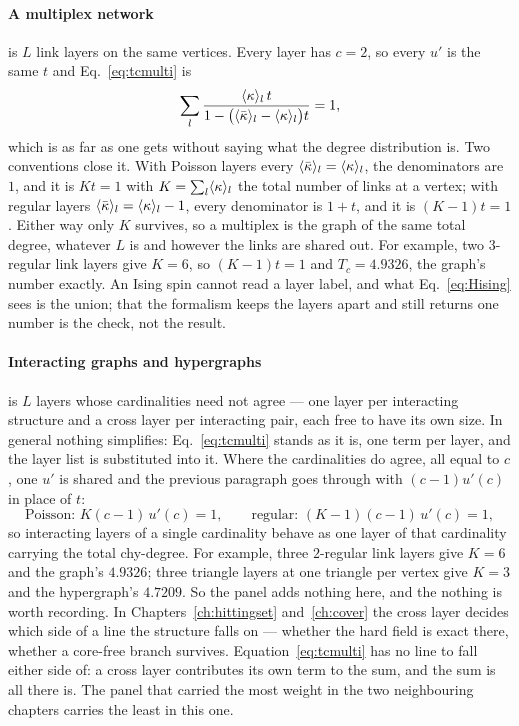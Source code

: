 \paragraph{A multiplex network} is $L$ link layers on the same vertices. Every
layer has $c=2$, so every $u'$ is the same $t$ and Eq.~\eqref{eq:tcmulti} is
\[
  \sum_{l}\frac{\langle \kappa \rangle_{l}\,t}
                {1-\bigl(\langle \bar\kappa \rangle_{l}-\langle \kappa \rangle_{l}\bigr)t}=1,
\]
which is as far as one gets without saying what the degree distribution is. Two
conventions close it. With Poisson layers every
$\langle \bar\kappa \rangle_{l}=\langle \kappa \rangle_{l}$, the denominators are $1$, and it is
$Kt=1$ with $K=\sum_{l}\langle \kappa \rangle_{l}$ the total number of links at a
vertex; with regular layers $\langle \bar\kappa \rangle_{l}=\langle \kappa \rangle_{l}-1$, every
denominator is $1+t$, and it is $(K-1)t=1$. Either way only $K$ survives, so a
multiplex is the graph of the same total degree, whatever $L$ is and however the
links are shared out. For example, two $3$-regular link layers give $K=6$, so
$(K-1)t=1$ and $T_{c}=4.9326$, the graph's number exactly. An Ising spin cannot read a layer label, and what
Eq.~\eqref{eq:Hising} sees is the union; that the formalism keeps the layers
apart and still returns one number is the check, not the result.

\paragraph{Interacting graphs and hypergraphs} is $L$ layers whose cardinalities
need not agree --- one layer per interacting structure and a cross layer per
interacting pair, each free to have its own size. In general nothing
simplifies: Eq.~\eqref{eq:tcmulti} stands as it is, one term per layer, and the
layer list is substituted into it. Where the cardinalities do agree, all equal
to $c$, one $u'$ is shared and the previous paragraph goes through with
$(c-1)u'(c)$ in place of $t$:
\[
  \text{Poisson: } K(c-1)\,u'(c)=1,
  \qquad
  \text{regular: } (K-1)(c-1)\,u'(c)=1,
\]
so interacting layers of a single cardinality behave as one layer of that
cardinality carrying the total chy-degree. For example, three $2$-regular link
layers give $K=6$ and the graph's $4.9326$; three triangle layers at one
triangle per vertex give $K=3$ and the hypergraph's $4.7209$. So the panel adds
nothing here, and the nothing is worth recording. In Chapters~\ref{ch:hittingset}
and~\ref{ch:cover} the cross layer decides which side of a line the structure
falls on --- whether the hard field is exact there, whether a core-free branch
survives. Equation~\eqref{eq:tcmulti} has no line to fall either side of: a
cross layer contributes its own term to the sum, and the sum is all there is.
The panel that carried the most weight in the two neighbouring chapters carries
the least in this one.

